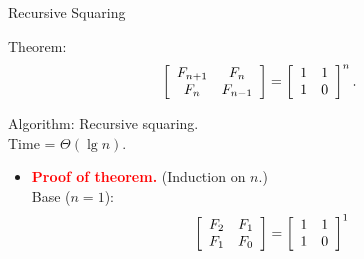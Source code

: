 \documentclass{beamer}
\begin{document}
\begin{frame}{Recursive Squaring}
    \begin{exampleblock}{Theorem:}
        $$
            \left[
                \begin{array}{c c}
                    F_{n + 1} & F_n \\
                    F_n       & F_{n - 1}
                \end{array}
            \right]
            =
            \left[
                \begin{array}{c c}
                    1 & 1 \\
                    1 & 0
                \end{array}
            \right]^n \text{.}
        $$
    \end{exampleblock} \pause
    \begin{exampleblock}{Algorithm:}
        Recursive squaring. \\
        Time = $\Theta(\lg n)$.
    \end{exampleblock} \pause
    \begin{itemize}
        \item[] \textbf{\textcolor{red}{Proof of theorem.}} (Induction on $n$.) \\
            Base ($n = 1$): \pause
            $$
                \left[
                    \begin{array}{c c}
                        F_2 & F_1 \\
                        F_1 & F_0
                    \end{array}
                \right]
                =
                \left[
                    \begin{array}{c c}
                        1 & 1 \\
                        1 & 0
                    \end{array}
                \right]^1
            $$
    \end{itemize}
\end{frame}
\end{document}
